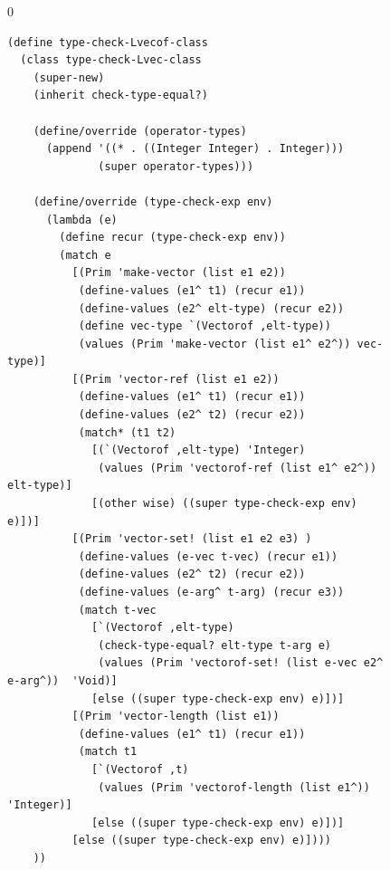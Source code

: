 \documentclass[7x10]{TimesAPriori_MIT}%
\def\racketEd{0}
\providecommand{\BookEdition}{1}
\let\edition\BookEdition
\numberwithin{theorem}{chapter}
\numberwithin{definition}{chapter}
\numberwithin{equation}{chapter}
\begin{document}
\begin{figure}[tbp]
  \begin{tcolorbox}[colback=white]
{\if\edition\racketEd    
    \begin{lstlisting}[basicstyle=\ttfamily\footnotesize]
(define type-check-Lvecof-class
  (class type-check-Lvec-class
    (super-new)
    (inherit check-type-equal?)

    (define/override (operator-types)
      (append '((* . ((Integer Integer) . Integer)))
              (super operator-types)))
    
    (define/override (type-check-exp env)
      (lambda (e)
        (define recur (type-check-exp env))
        (match e
          [(Prim 'make-vector (list e1 e2))
           (define-values (e1^ t1) (recur e1))
           (define-values (e2^ elt-type) (recur e2))
           (define vec-type `(Vectorof ,elt-type))
           (values (Prim 'make-vector (list e1^ e2^)) vec-type)]
          [(Prim 'vector-ref (list e1 e2))
           (define-values (e1^ t1) (recur e1))
           (define-values (e2^ t2) (recur e2))
           (match* (t1 t2)
             [(`(Vectorof ,elt-type) 'Integer)
              (values (Prim 'vectorof-ref (list e1^ e2^)) elt-type)]
             [(other wise) ((super type-check-exp env) e)])]
          [(Prim 'vector-set! (list e1 e2 e3) )
           (define-values (e-vec t-vec) (recur e1))
           (define-values (e2^ t2) (recur e2))
           (define-values (e-arg^ t-arg) (recur e3))
           (match t-vec
             [`(Vectorof ,elt-type)
              (check-type-equal? elt-type t-arg e)
              (values (Prim 'vectorof-set! (list e-vec e2^ e-arg^))  'Void)]
             [else ((super type-check-exp env) e)])]
          [(Prim 'vector-length (list e1))
           (define-values (e1^ t1) (recur e1))
           (match t1
             [`(Vectorof ,t)
              (values (Prim 'vectorof-length (list e1^))  'Integer)]
             [else ((super type-check-exp env) e)])]
          [else ((super type-check-exp env) e)])))
    ))


\end{lstlisting}}
\end{tcolorbox}
\end{figure}
\end{document}
